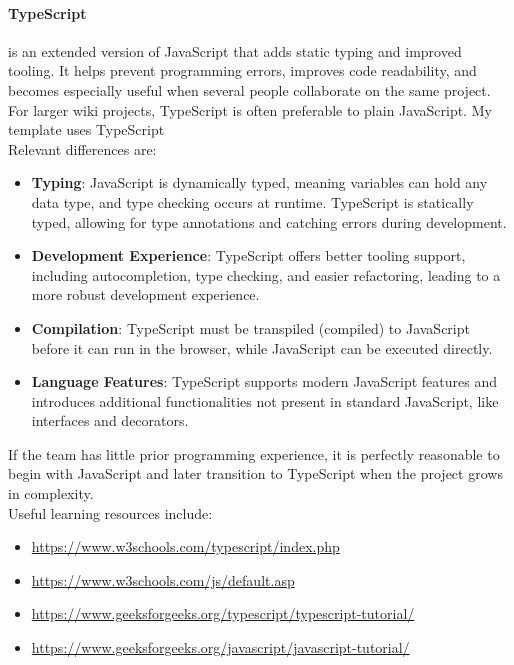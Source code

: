 \paragraph{TypeScript} is an extended version of JavaScript that adds static typing and improved tooling.
It helps prevent programming errors, improves code readability, and becomes especially useful when several people collaborate on the same project.
For larger wiki projects, TypeScript is often preferable to plain JavaScript.
My template uses TypeScript\\ \newline
Relevant differences are:
\begin{itemize}
    \item \textbf{Typing}: JavaScript is dynamically typed, meaning variables can hold any data type, and type checking occurs at runtime.
    TypeScript is statically typed, allowing for type annotations and catching errors during development.

    \item \textbf{Development Experience}: TypeScript offers better tooling support, including autocompletion, type checking, and easier refactoring, leading to a more robust development experience.

    \item \textbf{Compilation}: TypeScript must be transpiled (compiled) to JavaScript before it can run in the browser, while JavaScript can be executed directly.

    \item \textbf{Language Features}: TypeScript supports modern JavaScript features and introduces additional functionalities not present in standard JavaScript, like interfaces and decorators.
\end{itemize}
If the team has little prior programming experience, it is perfectly reasonable to begin with JavaScript and later transition to TypeScript when the project grows in complexity. \\ \newline
Useful learning resources include:
\begin{itemize}
    \item \url{https://www.w3schools.com/typescript/index.php}
    \item \url{https://www.w3schools.com/js/default.asp}
    \item \url{https://www.geeksforgeeks.org/typescript/typescript-tutorial/}
    \item \url{https://www.geeksforgeeks.org/javascript/javascript-tutorial/}
\end{itemize}